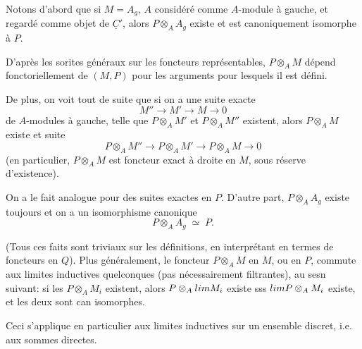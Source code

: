 \documentclass[11pt,a4paper]{article}
\begin{document}

Notons d'abord que si $M = A_g$, $A$ considéré comme $A$-module à gauche, et regardé comme  objet de $\underline{C}'$, alors $P \otimes_A A_g$ existe et est canoniquement isomorphe à $P$.

D'après les sorites généraux sur les foncteurs représentables, $P \otimes_A M$ dépend fonctoriellement de $(M,P)$   pour les arguments pour lesquels il est défini.

De plus, on voit tout de suite que si on a une suite exacte
\[
  M'' \longrightarrow M' \longrightarrow M \longrightarrow 0
\]
de $A$-modules à gauche, telle que $P \otimes_A M'$ et $P \otimes_A M''$ existent, alors $P \otimes_A M$ existe et   suite 
\[
  P \otimes_A M'' \longrightarrow P \otimes_A M' \longrightarrow P \otimes_A M \longrightarrow 0
\]
 (en particulier, $P \otimes_A M$ est foncteur exact à droite en $M$, sous réserve d'existence). 

On a le fait analogue pour des suites exactes en $P$. D'autre part, $P \otimes_A A_g$ existe toujours et on a un isomorphisme canonique
\[
  P \otimes_A A_g \;\simeq\; P .
\]
 

 (Tous ces faits sont triviaux sur les définitions, en interprétant en termes de foncteurs en $Q$).  Plus généralement, le foncteur $P \otimes_A M$ en $M$, ou en $P$, commute aux limites inductives quelconques (pas nécessairement filtrantes), au sesn  suivant: si les $P \otimes_A M_i$ existent,  alors $P \otimes_A \varinjlim M_i$ existe sss $\varinjlim P \otimes_A M_i$ existe, et les deux sont can isomorphes.

Ceci s'applique en particulier aux limites inductives sur un ensemble discret, i.e. aux sommes directes.
\end{document}
